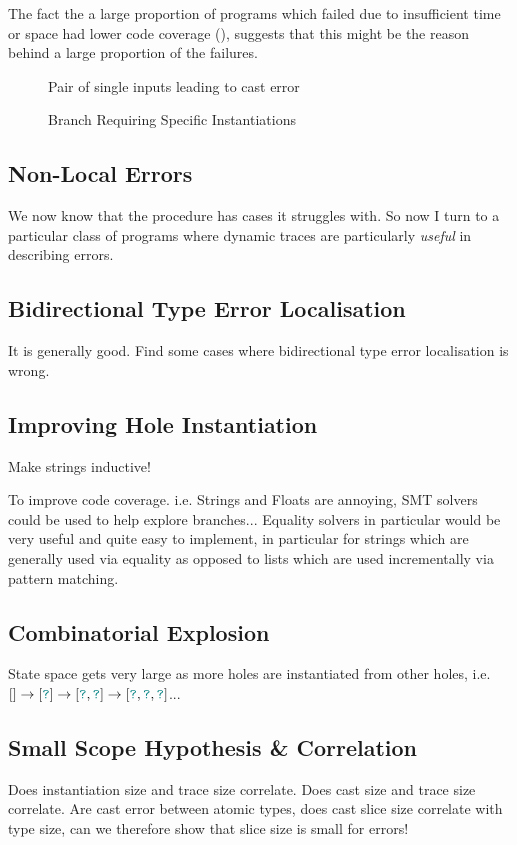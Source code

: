 The fact the a large proportion of programs which failed due to insufficient time or space had lower code coverage (), suggests that this might be the reason behind a large proportion of the failures.

\begin{figure}
Pair of single inputs leading to cast error
\caption{Branch Requiring Specific Instantiations}
\end{figure}

\subsection{Non-Local Errors}
We now know that the procedure has cases it struggles with. So now I turn to a particular class of programs where dynamic traces are particularly \textit{useful} in describing errors.

\subsection{Bidirectional Type Error Localisation}
It is generally good. Find some cases where bidirectional type error localisation is wrong.
\subsection{Improving Hole Instantiation}
\label{sec:EvalHoleInstantiation}
Make strings inductive!

To improve code coverage. i.e. Strings and Floats are annoying, SMT solvers could be used to help explore branches... Equality solvers in particular would be very useful and quite easy to implement, in particular for strings which are generally used via equality as opposed to lists which are used incrementally via pattern matching.
\subsection{Combinatorial Explosion}
State space gets very large as more holes are instantiated from other holes, i.e. $[] \to [{\color{teal}\texttt{?}}] \to [{\color{teal}\texttt{?}}, {\color{teal}\texttt{?}}] \to [{\color{teal}\texttt{?}},{\color{teal}\texttt{?}},{\color{teal}\texttt{?}}]$...

\subsection{Small Scope Hypothesis \& Correlation}
Does instantiation size and trace size correlate. Does cast size and trace size correlate.
Are cast error between atomic types, does cast slice size correlate with type size, can we therefore show that slice size is small for errors!

